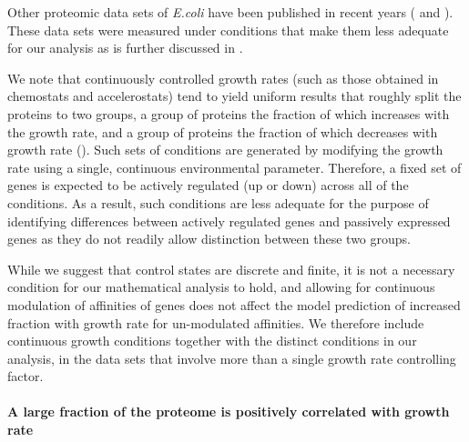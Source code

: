 \documentclass[10pt,letterpaper]{article}
\begin{document}
Other proteomic data sets of \emph{E.coli} have been published in recent years (\cite{Valgepea2013} and \cite{Hui_2015}).
These data sets were measured under conditions that make them less adequate for our analysis as is further discussed in .

We note that continuously controlled growth rates (such as those obtained in chemostats and accelerostats) tend to yield uniform results that roughly split the proteins to two groups, a group of proteins the fraction of which increases with the growth rate, and a group of proteins the fraction of which decreases with growth rate ().
Such sets of conditions are generated by modifying the growth rate using a single, continuous environmental parameter.
Therefore, a fixed set of genes is expected to be actively regulated (up or down) across all of the conditions.
As a result, such conditions are less adequate for the purpose of identifying differences between actively regulated genes and passively expressed genes as they do not readily allow distinction between these two groups.

While we suggest that control states are discrete and finite, it is not a necessary condition for our mathematical analysis to hold, and allowing for continuous modulation of affinities of genes does not affect the model prediction of increased fraction with growth rate for un-modulated affinities.
We therefore include continuous growth conditions together with the distinct conditions in our analysis, in the data sets that involve more than a single growth rate controlling factor.

\paragraph{A large fraction of the proteome is positively correlated with growth rate}
\end{document}
